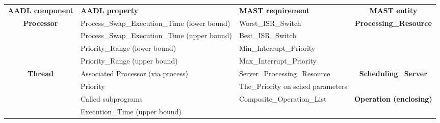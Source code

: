 \documentclass[11pt]{book}
\newcommand{\tbf}[1]{\textbf{#1}}
\begin{document}
\footnotesize{
\begin{tabular}{|c|p{5cm}|p{5cm}|c|}
\cline{1-4}
\textbf{AADL component} & \textbf{AADL property} & \textbf{MAST requirement} & \textbf{MAST entity} \\ \cline{1-4}
\multicolumn{1}{|c|}{\multirow{4}{*}{\tbf{Processor}}} &
\multicolumn{1}{|p{4cm}|}{Process\_Swap\_Execution\_Time (lower bound)}                             &   
\multicolumn{1}{|p{4cm}|}{Worst\_ISR\_Switch}                                         &   
\multicolumn{1}{|c|}{\multirow{4}{*}{\tbf{Processing\_Resource}}} \\  \cline {2-3}
\multicolumn{1}{|c|}{} &
\multicolumn{1}{|p{4cm}|}{Process\_Swap\_Execution\_Time (upper bound)}                             &   
\multicolumn{1}{|p{4cm}|}{Best\_ISR\_Switch}                                         &   
\multicolumn{1}{|c|}{} \\   \cline {2-3}
\multicolumn{1}{|c|}{} &
\multicolumn{1}{|p{4cm}|}{Priority\_Range (lower bound)}                             &   
\multicolumn{1}{|p{4cm}|}{Min\_Interrupt\_Priority}                                         &   
\multicolumn{1}{|c|}{} \\  \cline {2-3}
\multicolumn{1}{|c|}{} &
\multicolumn{1}{|p{4cm}|}{Priority\_Range (upper bound)}                                           &  
\multicolumn{1}{|p{4cm}|}{Max\_Interrupt\_Priority}                                           &   
\multicolumn{1}{|c|}{} \\ 
\hline \hline
\multicolumn{1}{|c|}{\multirow{7}{*}{\tbf{Thread}}} &
\multicolumn{1}{|p{4cm}|}{Associated Processor (via process)}                             &   
\multicolumn{1}{|p{4cm}|}{Server\_Processing\_Resource}                                         &   
\multicolumn{1}{|c|}{\multirow{2}{*}{\tbf{Scheduling\_Server}}} \\  \cline {2-3}
\multicolumn{1}{|c|}{} &
\multicolumn{1}{|p{4cm}|}{Priority}                             &   
\multicolumn{1}{|p{4cm}|}{The\_Priority on sched parameters}                                         &   
\multicolumn{1}{|c|}{} \\   \cline {2-4}
\multicolumn{1}{|c|}{} &
\multicolumn{1}{|p{4cm}|}{Called subprograms}                             &   
\multicolumn{1}{|p{4cm}|}{Composite\_Operation\_List}                                         &   
\multicolumn{1}{|c|}{\multirow{2}{*}{\tbf{Operation (enclosing)}}} \\  \cline {2-3}
\multicolumn{1}{|c|}{} &
\multicolumn{1}{|p{4cm}|}{Execution\_Time (upper bound)}                             &   

\end{tabular}}
\end{document}
